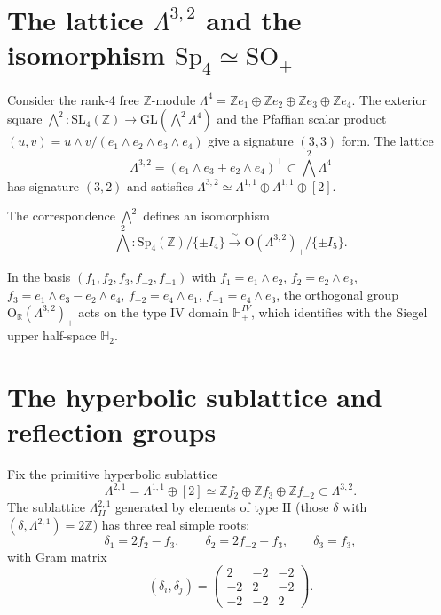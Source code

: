 \section{The lattice $\Lambda^{3,2}$ and the isomorphism $\mathrm{Sp}_4 \simeq \mathrm{SO}_+$}
\label{sec:k3e-lattice}

Consider the rank-4 free $\mathbb{Z}$-module $\Lambda^4 = \mathbb{Z}e_1 \oplus \mathbb{Z}e_2 \oplus \mathbb{Z}e_3 \oplus \mathbb{Z}e_4$. The exterior square $\bigwedge^2 \colon \mathrm{SL}_4(\mathbb{Z}) \to \mathrm{GL}(\bigwedge^2 \Lambda^4)$ and the Pfaffian scalar product $(u,v) = u \wedge v / (e_1 \wedge e_2 \wedge e_3 \wedge e_4)$ give a signature $(3,3)$ form. The lattice
\[
 \Lambda^{3,2} = (e_1 \wedge e_3 + e_2 \wedge e_4)^\perp \subset \bigwedge^2 \Lambda^4
\]
has signature $(3,2)$ and satisfies $\Lambda^{3,2} \simeq \Lambda^{1,1} \oplus \Lambda^{1,1} \oplus [2]$.

\begin{lemma}
\label{lem:sp4-so-iso}
The correspondence $\bigwedge^2$ defines an isomorphism
\[
 \bigwedge^2 \colon \mathrm{Sp}_4(\mathbb{Z})/\{\pm I_4\} \xrightarrow{\;\sim\;} \mathrm{O}(\Lambda^{3,2})_+/\{\pm I_5\}.
\]
\end{lemma}

In the basis $(f_1, f_2, f_3, f_{-2}, f_{-1})$ with $f_1 = e_1 \wedge e_2$, $f_2 = e_2 \wedge e_3$, $f_3 = e_1 \wedge e_3 - e_2 \wedge e_4$, $f_{-2} = e_4 \wedge e_1$, $f_{-1} = e_4 \wedge e_3$, the orthogonal group $\mathrm{O}_\mathbb{R}(\Lambda^{3,2})_+$ acts on the type IV domain $\mathbb{H}^{IV}_+$, which identifies with the Siegel upper half-space $\mathbb{H}_2$.

\section{The hyperbolic sublattice and reflection groups}
\label{sec:k3e-reflections}

Fix the primitive hyperbolic sublattice
\[
 \Lambda^{2,1} = \Lambda^{1,1} \oplus [2] \simeq \mathbb{Z}f_2 \oplus \mathbb{Z}f_3 \oplus \mathbb{Z}f_{-2} \subset \Lambda^{3,2}.
\]
The sublattice $\Lambda^{2,1}_{II}$ generated by elements of type II (those $\delta$ with $(\delta, \Lambda^{2,1}) = 2\mathbb{Z}$) has three real simple roots:
\[
 \delta_1 = 2f_2 - f_3, \qquad \delta_2 = 2f_{-2} - f_3, \qquad \delta_3 = f_3,
\]
with Gram matrix
\[
 (\delta_i, \delta_j) = \begin{pmatrix} 2 & -2 & -2 \\ -2 & 2 & -2 \\ -2 & -2 & 2 \end{pmatrix}.
\]

